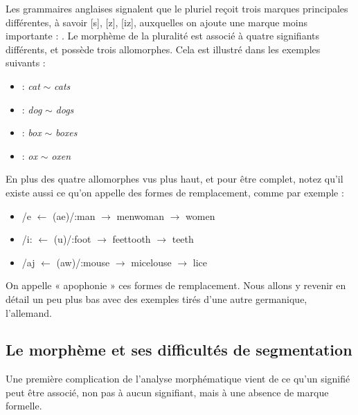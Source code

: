 Les grammaires anglaises signalent que le pluriel reçoit trois marques principales différentes, à savoir [s], [z], [iz], auxquelles on ajoute une marque moins importante : \bipa{[ən]}. Le morphème de la pluralité est associé à quatre signifiants différents, et possède trois allomorphes. Cela est illustré dans les exemples suivants :
\begin{itemize}
\item \bipa{[s]}\quad : \textit{cat} \bipa{[kæt]}\qquad $\sim$ \textit{cats} \bipa{[kæts]}
\item \bipa{[z]}\quad : \textit{dog} \bipa{[dog]}\qquad $\sim$ \textit{dogs} \bipa{[dogz]}
\item \bipa{[iz]} : \textit{box} \bipa{[boks]}\qquad $\sim$ \textit{boxes} \bipa{[boksiz]}
\item \bipa{[Ɔn]} : \textit{ox} \bipa{[ɑks]}\qquad $\sim$ \textit{oxen} \bipa{[oksən]}
\end{itemize}
En plus des quatre allomorphes vus plus haut, et pour être complet, notez qu’il existe aussi ce qu’on appelle des formes de remplacement, comme par exemple :
\begin{itemize}
\item /e $\leftarrow$ (ae)/\quad :\quad man $\rightarrow$ men\qquad woman $\rightarrow$ women
\item /i: $\leftarrow$ (u)/\quad :\quad foot $\rightarrow$ feet\qquad tooth $\rightarrow$ teeth
\item /aj $\leftarrow$ (aw)/\quad :\quad mouse $\rightarrow$ mice\qquad louse $\rightarrow$ lice
\end{itemize}
On appelle « apophonie » ces formes de remplacement. Nous allons y revenir en détail un peu plus bas avec des exemples tirés d’une autre germanique, l’allemand.

\subsection{Le morphème et ses difficultés de segmentation}
Une première complication de l’analyse morphématique vient de ce qu’un signifié peut être associé, non pas à aucun signifiant, mais à une absence de marque formelle.

